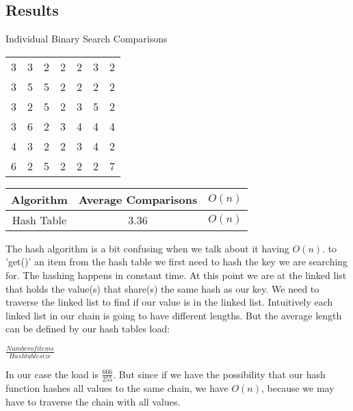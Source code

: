 \documentclass{article}
\begin{document}
\subsection{Results}
\begin{center}
Individual Binary Search Comparisons

\vspace{2mm}
\begin{tabular}{ c c c c c c c }
3 & 3 & 2 & 2 & 2 & 3 & 2\\
3 & 5 & 5 & 2 & 2 & 2 & 2\\
3 & 2 & 5 & 2 & 3 & 5 & 2\\
3 & 6 & 2 & 3 & 4 & 4 & 4\\
4 & 3 & 2 & 2 & 3 & 4 & 2\\
6 & 2 & 5 & 2 & 2 & 2 & 7
\end{tabular}
\end{center}
\begin{tabular}{c|c|c}
    Algorithm & Average Comparisons & $O(n)$ \\
\hline
    Hash Table & 3.36 & $O(n)$
\end{tabular}
\vspace{5mm}

The hash algorithm is a bit confusing when we talk about it having $O(n)$.
to 'get()' an item from the hash table we first need to hash the key we are searching for. The hashing happens in constant time. At this point we are at the linked list that holds the value(s) that share(s) the same hash as our key. We need to traverse the linked list to find if our value is in the linked list. Intuitively each linked list in our chain is going to have different lengths. But the average length can be defined by our hash tables load:

\vspace{2mm}

$\frac{    Number   of   items     }{    Hash   table   size    }$
\vspace{2mm}

In our case the load is $\frac{666}{255}$. But since if we have the possibility that our hash function hashes all values to the same chain, we have $O(n)$, because we may have to traverse the chain with all values.
\end{document}

